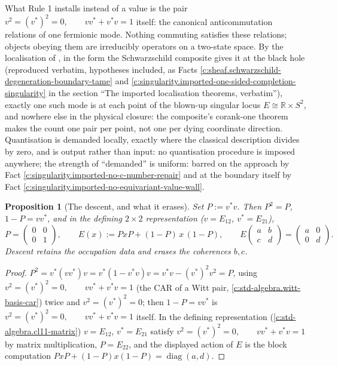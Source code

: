 \documentclass[11pt]{article}
\newtheorem{proposition}[theorem]{Proposition}
\theoremstyle{definition}
\theoremstyle{plain}
\providecommand{\R}{}\renewcommand{\R}{\mathbb{R}}
\begin{document}
\label{c:note.singularity.setting-point-level-transport-instantiated-2}
What Rule 1 installs instead of a value is the pair $v^2 = (v^*)^2 = 0, \qquad v v^* + v^* v = 1$ itself: the canonical anticommutation relations of one fermionic mode. Nothing commuting satisfies these relations; objects obeying them are irreducibly operators on a two-state space. By the localisation of \cite[Cor.~4.5]{ButlerT4}, in the form the Schwarzschild composite gives it at the black hole \cite[Thm.~8.12]{ButlerT4} (reproduced verbatim, hypotheses included, as Facts \ref{c:sheaf.schwarzschild-degeneration-boundary-tame} and \ref{c:singularity.imported-one-sided-completion-singularity} in the section ``The imported localisation theorems, verbatim''), exactly one such mode is at each point of the blown-up singular locus $E \cong \R \times S^2$, and nowhere else in the physical closure: the composite's corank-one theorem \cite[Thm.~8.7]{ButlerT4} makes the count one pair per point, not one per dying coordinate direction. Quantisation is demanded locally, exactly where the classical description divides by zero, and is output rather than input: no quantisation procedure is imposed anywhere; the strength of ``demanded'' is uniform: barred on the approach by Fact \ref{c:singularity.imported-no-c-number-repair} and at the boundary itself by Fact \ref{c:singularity.imported-no-equivariant-value-wall}.

\begin{proposition}[The descent, and what it erases]\label{c:singularity.descent-what-it-erases}
Set $P := v^* v$. Then $P^2 = P$, $1 - P = v v^*$, and in the defining $2 \times 2$ representation ($v = E_{12}$, $v^* = E_{21}$),
\[
P = \begin{pmatrix} 0 & 0 \\ 0 & 1 \end{pmatrix}, \qquad
E(x) := P x P + (1{-}P)\,x\,(1{-}P), \qquad
E\begin{pmatrix} a & b \\ c & d \end{pmatrix} = \begin{pmatrix} a & 0 \\ 0 & d \end{pmatrix} .
\]
Descent retains the occupation data and erases the coherences $b, c$.
\end{proposition}
\begin{proof}
$P^2 = v^*(v v^*)v = v^*(1 - v^* v)v = v^* v - (v^*)^2 v^2 = P$, using $v^2 = (v^*)^2 = 0, \qquad v v^* + v^* v = 1$ (the CAR of a Witt pair, \ref{c:std-algebra.witt-basis-car}) twice and $v^2 = (v^*)^2 = 0$; then $1 - P = vv^*$ is $v^2 = (v^*)^2 = 0, \qquad v v^* + v^* v = 1$ itself. In the defining representation (\ref{c:std-algebra.cl11-matrix}) $v = E_{12}$, $v^*= E_{21}$ satisfy $v^2 = (v^*)^2 = 0, \qquad v v^* + v^* v = 1$ by matrix multiplication, $P = E_{22}$, and the displayed action of $E$ is the block computation $PxP + (1{-}P)x(1{-}P) = \operatorname{diag}(a, d)$.

\end{proof}
\end{document}
